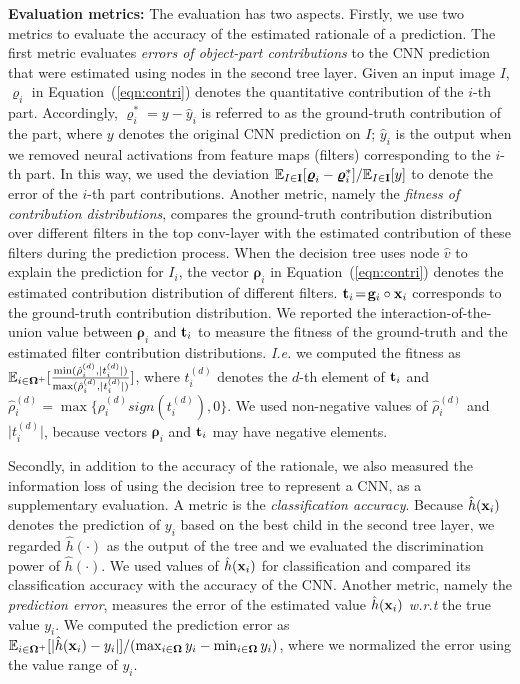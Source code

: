 \documentclass[10pt,twocolumn,letterpaper]{article}
\begin{document}
\textbf{Evaluation metrics:} The evaluation has two aspects. Firstly, we use two metrics to evaluate the accuracy of the estimated rationale of a prediction. The first metric evaluates \textit{errors of object-part contributions} to the CNN prediction that were estimated using nodes in the second tree layer. Given an input image $I$, ${\boldsymbol\varrho}_{i}$ in Equation~(\ref{eqn:contri}) denotes the quantitative contribution of the $i$-th part. Accordingly, {\small${\boldsymbol\varrho}_{i}^{*}\!=\!y-\hat{y}_{i}$} is referred to as the ground-truth contribution of the part, where $y$ denotes the original CNN prediction on $I$; $\hat{y}_{i}$ is the output when we removed neural activations from feature maps (filters) corresponding to the $i$-th part. In this way, we used the deviation $\mathbb{E}_{I\in{\bf I}}[{\boldsymbol\varrho}_{i}-{\boldsymbol\varrho}_{i}^{*}]/\mathbb{E}_{I\in{\bf I}}[y]$ to denote the error of the $i$-th part contributions. Another metric, namely the \textit{fitness of contribution distributions}, compares the ground-truth contribution distribution over different filters in the top conv-layer with the estimated contribution of these filters during the prediction process. When the decision tree uses node $\hat{v}$ to explain the prediction for $I_{i}$, the vector ${\boldsymbol\rho}_{i}$ in Equation~(\ref{eqn:contri}) denotes the estimated contribution distribution of different filters. {\small${\bf t}_{i}\!=\!{\bf g}_{i}\circ{\bf x}_{i}$} corresponds to the ground-truth contribution distribution. We reported the interaction-of-the-union value between ${\boldsymbol\rho}_{i}$ and ${\bf t}_{i}$ to measure the fitness of the ground-truth and the estimated filter contribution distributions. \emph{I.e.} we computed the fitness as {\small${\mathbb{E}}_{i\in{\bf\Omega}^{+}}[\frac{\min(\hat{\rho}_{i}^{(d)},\vert t_{i}^{(d)}\vert)}{\max(\hat{\rho}_{i}^{(d)},\vert t_{i}^{(d)}\vert)}]$}, where $t_{i}^{(d)}$ denotes the $d$-th element of ${\bf t}_{i}$ and {\small$\hat{\rho}_{i}^{(d)}\!=\!\max\{\rho_{i}^{(d)}sign(t_{i}^{(d)}),0\}$}. We used non-negative values of $\hat{\rho}_{i}^{(d)}$ and $\vert t_{i}^{(d)}\vert$, because vectors ${\boldsymbol\rho}_{i}$ and ${\bf t}_{i}$ may have negative elements.

Secondly, in addition to the accuracy of the rationale, we also measured the information loss of using the decision tree to represent a CNN, as a supplementary evaluation. A metric is the \textit{classification accuracy}. Because $\hat{h}({\bf x}_{i})$ denotes the prediction of $y_{i}$ based on the best child in the second tree layer, we regarded $\hat{h}(\cdot)$ as the output of the tree and we evaluated the discrimination power of $\hat{h}(\cdot)$. We used values of $\hat{h}({\bf x}_{i})$ for classification and compared its classification accuracy with the accuracy of the CNN. Another metric, namely the \textit{prediction error}, measures the error of the estimated value $\hat{h}({\bf x}_{i})$ \emph{w.r.t} the true value $y_{i}$. We computed the prediction error as {\small${\mathbb{E}}_{i\in{\bf\Omega}^{+}}[\vert\hat{h}({\bf x}_{i})-y_{i}\vert]/(\max_{i\in{\bf\Omega}}y_{i}-\min_{i\in{\bf\Omega}}y_{i})$}, where we normalized the error using the value range of $y_{i}$.
\end{document}
